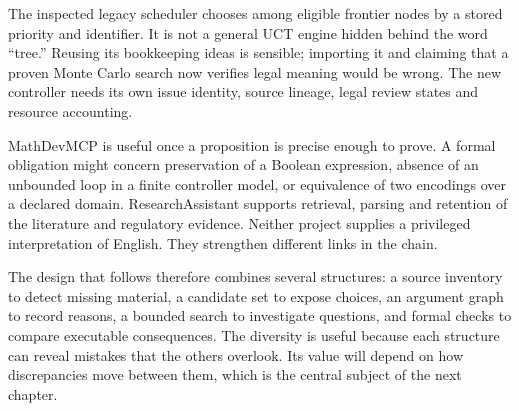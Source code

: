 The inspected legacy scheduler chooses among eligible frontier nodes by a stored
priority and identifier. It is not a general UCT engine hidden behind the word
``tree.'' Reusing its bookkeeping ideas is sensible; importing it and claiming
that a proven Monte Carlo search now verifies legal meaning would be wrong. The
new controller needs its own issue identity, source lineage, legal review states
and resource accounting.

MathDevMCP is useful once a proposition is precise enough to prove. A formal
obligation might concern preservation of a Boolean expression, absence of an
unbounded loop in a finite controller model, or equivalence of two encodings over
a declared domain. ResearchAssistant supports retrieval, parsing and retention
of the literature and regulatory evidence. Neither project supplies a privileged
interpretation of English. They strengthen different links in the chain.

The design that follows therefore combines several structures: a source inventory
to detect missing material, a candidate set to expose choices, an argument graph
to record reasons, a bounded search to investigate questions, and formal checks
to compare executable consequences. The diversity is useful because each
structure can reveal mistakes that the others overlook. Its value will depend on
how discrepancies move between them, which is the central subject of the next
chapter.
